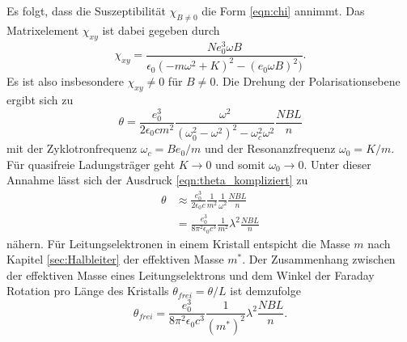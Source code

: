 \noindent
Es folgt, dass die Suszeptibilität $\chi_{B\neq 0}$ die Form \ref{eqn:chi} annimmt. Das Matrixelement $\chi_{xy}$ ist dabei gegeben 
durch 
\begin{equation*}
    \chi_{xy}=\frac{Ne_0^3\omega B}{\epsilon_0(-m\omega^2+K)^2-(e_0\omega B)^2)} .
\end{equation*}
Es ist also insbesondere $\chi_{xy}\neq 0$ für $B\neq 0$. Die Drehung der Polarisationsebene ergibt sich zu 
\begin{equation}
    \theta=\frac{e_0^3}{2\epsilon_0 c m^2}\frac{\omega^2}{(\omega_0^2-\omega^2)^2-\omega_c^2\omega^2}\frac{NBL}{n}
    \label{eqn:theta_kompliziert}
\end{equation}
mit der Zyklotronfrequenz $\omega_c=Be_0/m$ und der Resonanzfrequenz $\omega_0=K/m$. 
Für quasifreie Ladungsträger geht $K\to0$ und somit $\omega_0\to 0$. Unter dieser Annahme lässt sich der Ausdruck 
\ref{eqn:theta_kompliziert} zu
\begin{align*}
    \theta&\approx\frac{e_0^3}{2\epsilon_0 c}\frac{1}{m^2}\frac{1}{\omega^2}\frac{NBL}{n}\\
    &=\frac{e_0^3}{8\pi^2\epsilon_0c^3}\frac{1}{m^2}\lambda^2\frac{NBL}{n}
\end{align*} 
nähern. Für Leitungselektronen in einem Kristall entspicht die Masse $m$ nach Kapitel \ref{sec:Halbleiter} der effektiven
Masse $m^*$. Der Zusammenhang zwischen der effektiven Masse eines Leitungselektrons und dem Winkel der Faraday Rotation pro
Länge des Kristalls $\theta_{frei}=\theta/L$ ist demzufolge
\begin{equation}
    \theta_{frei}=\frac{e_0^3}{8\pi^2\epsilon_0c^3}\frac{1}{(m^*)^2}\lambda^2\frac{NBL}{n}.
    \label{eqn:winkel_masse}
\end{equation}